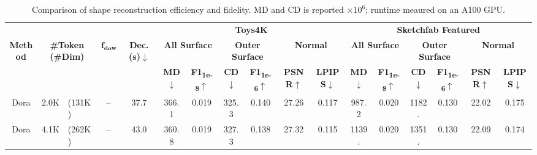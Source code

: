 \documentclass[10pt,twocolumn,letterpaper]{article}
\begin{document}
\begin{table}[t]
        \centering
        \scriptsize
        \caption{Comparison of shape reconstruction efficiency and fidelity. MD and CD is reported $\times 10^6$;  runtime meaured on an A100 GPU.}
        \vspace{-8pt}
        \renewcommand{\arraystretch}{1}
        \setlength{\tabcolsep}{3pt}
        \begin{tabular}{cr@{\,}lcccccccccccccc}
        \toprule
        & & & & & \multicolumn{6}{c}{\textbf{Toys4K}} & \multicolumn{6}{c}{\textbf{Sketchfab Featured}} \\
        [-0.5ex]\cmidrule(lr){6-11}\cmidrule(lr){12-17}
        \textbf{Method} & \multicolumn{2}{c}{\textbf{\#Token \tiny{(\#Dim)}}} & $\boldsymbol{f_{\text{down}}}$ & \textbf{Dec. {\tiny(s)}}$\downarrow$ & \multicolumn{2}{c}{\textbf{All Surface}} & \multicolumn{2}{c}{\textbf{Outer Surface}} & \multicolumn{2}{c}{\textbf{Normal}} & \multicolumn{2}{c}{\textbf{All Surface}} & \multicolumn{2}{c}{\textbf{Outer Surface}} & \multicolumn{2}{c}{\textbf{Normal}} \\
        [-0.5ex]\cmidrule(lr){6-7}\cmidrule(lr){8-9}\cmidrule(lr){10-11}\cmidrule(lr){12-13}\cmidrule(lr){14-15}\cmidrule(lr){16-17}
         & & & & & \textbf{MD$\downarrow$} & \textbf{F1\textsubscript{1e-8}$\uparrow$} & \textbf{CD$\downarrow$} & \textbf{F1\textsubscript{1e-6}$\uparrow$} & \textbf{PSNR$\uparrow$} & \textbf{LPIPS$\downarrow$} & \textbf{MD$\downarrow$} & \textbf{F1\textsubscript{1e-8}$\uparrow$} & \textbf{CD$\downarrow$} & \textbf{F1\textsubscript{1e-6}$\uparrow$} & \textbf{PSNR$\uparrow$} & \textbf{LPIPS$\downarrow$} \\
        \midrule
        Dora & 2.0K & \tiny{(131K)} & -- & \cellcolor[rgb]{1.00,0.81,0.80}37.7 & \cellcolor[rgb]{1.00,0.80,0.80}366.1 & \cellcolor[rgb]{1.00,0.81,0.80}0.019 & \cellcolor[rgb]{1.00,0.80,0.80}325.3 & \cellcolor[rgb]{1.00,0.86,0.80}0.140 & \cellcolor[rgb]{1.00,0.82,0.80}27.26 & \cellcolor[rgb]{1.00,0.86,0.80}0.117 & \cellcolor[rgb]{1.00,0.81,0.80}987.2 & \cellcolor[rgb]{1.00,0.81,0.80}0.020 & \cellcolor[rgb]{1.00,0.81,0.80}1182. & \cellcolor[rgb]{1.00,0.86,0.80}0.130 & \cellcolor[rgb]{1.00,0.80,0.80}22.02 & \cellcolor[rgb]{1.00,0.80,0.80}0.175 \\
        Dora & 4.1K & \tiny{(262K)} & -- & \cellcolor[rgb]{1.00,0.80,0.80}43.0 & \cellcolor[rgb]{1.00,0.80,0.80}360.8 & \cellcolor[rgb]{1.00,0.81,0.80}0.019 & \cellcolor[rgb]{1.00,0.80,0.80}327.3 & \cellcolor[rgb]{1.00,0.86,0.80}0.138 & \cellcolor[rgb]{1.00,0.82,0.80}27.32 & \cellcolor[rgb]{1.00,0.87,0.80}0.115 & \cellcolor[rgb]{1.00,0.80,0.80}1139. & \cellcolor[rgb]{1.00,0.81,0.80}0.020 & \cellcolor[rgb]{1.00,0.80,0.80}1351. & \cellcolor[rgb]{1.00,0.86,0.80}0.130 & \cellcolor[rgb]{1.00,0.80,0.80}22.09 & \cellcolor[rgb]{1.00,0.80,0.80}0.174 \\

\end{tabular}
\end{table}
\end{document}
